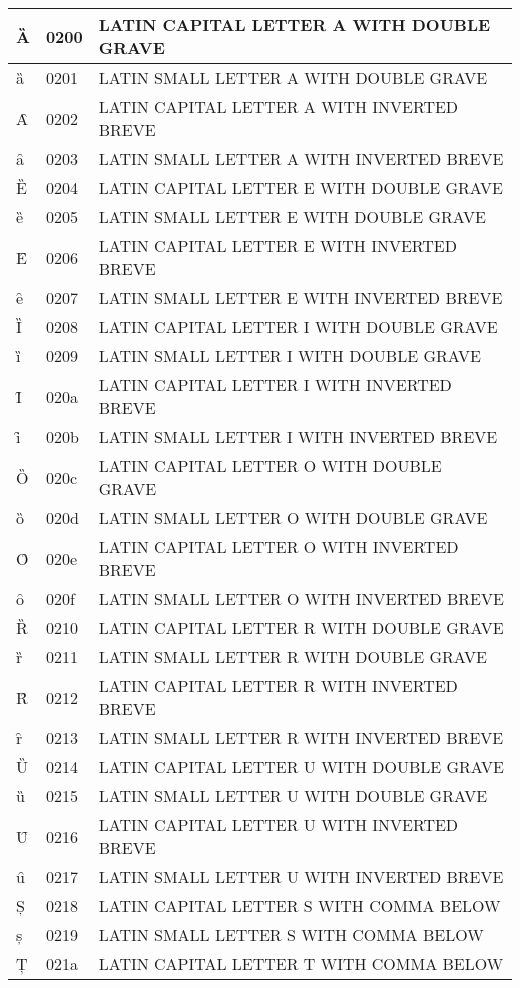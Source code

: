\documentclass[12pt,letterpaper,openany]{book}
\begin{document}
\begin{center}
\begin{supertabular}{|m{0.25in}|m{0.5in}|m{4in}|}
Ȁ & 0200 & LATIN CAPITAL LETTER A WITH DOUBLE GRAVE\\\hline
ȁ & 0201 & LATIN SMALL LETTER A WITH DOUBLE GRAVE\\\hline
Ȃ & 0202 & LATIN CAPITAL LETTER A WITH INVERTED BREVE\\\hline
ȃ & 0203 & LATIN SMALL LETTER A WITH INVERTED BREVE\\\hline
Ȅ & 0204 & LATIN CAPITAL LETTER E WITH DOUBLE GRAVE\\\hline
ȅ & 0205 & LATIN SMALL LETTER E WITH DOUBLE GRAVE\\\hline
Ȇ & 0206 & LATIN CAPITAL LETTER E WITH INVERTED BREVE\\\hline
ȇ & 0207 & LATIN SMALL LETTER E WITH INVERTED BREVE\\\hline
Ȉ & 0208 & LATIN CAPITAL LETTER I WITH DOUBLE GRAVE\\\hline
ȉ & 0209 & LATIN SMALL LETTER I WITH DOUBLE GRAVE\\\hline
Ȋ & 020a & LATIN CAPITAL LETTER I WITH INVERTED BREVE\\\hline
ȋ & 020b & LATIN SMALL LETTER I WITH INVERTED BREVE\\\hline
Ȍ & 020c & LATIN CAPITAL LETTER O WITH DOUBLE GRAVE\\\hline
ȍ & 020d & LATIN SMALL LETTER O WITH DOUBLE GRAVE\\\hline
Ȏ & 020e & LATIN CAPITAL LETTER O WITH INVERTED BREVE\\\hline
ȏ & 020f & LATIN SMALL LETTER O WITH INVERTED BREVE\\\hline
Ȑ & 0210 & LATIN CAPITAL LETTER R WITH DOUBLE GRAVE\\\hline
ȑ & 0211 & LATIN SMALL LETTER R WITH DOUBLE GRAVE\\\hline
Ȓ & 0212 & LATIN CAPITAL LETTER R WITH INVERTED BREVE\\\hline
ȓ & 0213 & LATIN SMALL LETTER R WITH INVERTED BREVE\\\hline
Ȕ & 0214 & LATIN CAPITAL LETTER U WITH DOUBLE GRAVE\\\hline
ȕ & 0215 & LATIN SMALL LETTER U WITH DOUBLE GRAVE\\\hline
Ȗ & 0216 & LATIN CAPITAL LETTER U WITH INVERTED BREVE\\\hline
ȗ & 0217 & LATIN SMALL LETTER U WITH INVERTED BREVE\\\hline
Ș & 0218 & LATIN CAPITAL LETTER S WITH COMMA BELOW\\\hline
ș & 0219 & LATIN SMALL LETTER S WITH COMMA BELOW\\\hline
Ț & 021a & LATIN CAPITAL LETTER T WITH COMMA BELOW\\\hline

\end{supertabular}
\end{center}
\end{document}
